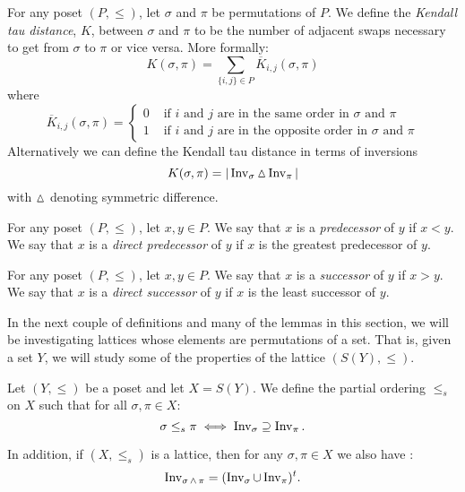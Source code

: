 	\begin{definition}
		\label{kendall-tau-definition}
		For any poset $(P, \le)$, let $\sigma$ and $\pi$ be permutations of $P$. We define the \emph{Kendall tau distance}, $K$, between $\sigma$ and $\pi$ to be the number of adjacent swaps necessary to get from $\sigma$ to $\pi$ or vice versa. More formally:
		\[
			K(\sigma, \pi) = \sum_{\{i, j\} \in P} \overline{K}_{i, j}(\sigma, \pi)
		\]
		where
		\[
			\overline{K}_{i,j}(\sigma, \pi) =
				\begin{cases}
					0 & \textrm{ if } i \textrm{ and } j \textrm{ are in the same order in } \sigma \textrm{ and } \pi \\
					1 & \textrm{ if } i \textrm{ and } j \textrm{ are in the opposite order in } \sigma \textrm{ and } \pi
				\end{cases}
		\]
		Alternatively we can define the Kendall tau distance in terms of inversions
		\[
			K(\sigma, \pi) = |\operatorname{Inv}_{\sigma} \operatorname{\vartriangle} \operatorname{Inv}_{\pi}|
		\]
		with $\operatorname{\vartriangle}$ denoting symmetric difference.
	\end{definition}

	\begin{definition}
		For any poset $(P, \le)$, let $x,y \in P$. We say that $x$ is a \emph{predecessor} of $y$ if $x < y$. We say that $x$ is a \emph{direct predecessor} of $y$ if $x$ is the greatest predecessor of $y$.
	\end{definition}

	\begin{definition}
		For any poset $(P, \le)$, let $x,y \in P$. We say that $x$ is a \emph{successor} of $y$ if $x > y$. We say that $x$ is a \emph{direct successor} of $y$ if $x$ is the least successor of $y$.
	\end{definition}

	In the next couple of definitions and many of the lemmas in this section, we will be investigating lattices whose elements are permutations of a set. That is, given a set $Y$, we will study some of the properties of the lattice $(S(Y), \le)$.

	\begin{definition}[$\le_s$]
		\label{partial-order-s-definition}
		Let $(Y, \le)$ be a poset and let $X = S(Y)$. We define the partial ordering $\le_s$ on $X$ such that for all $\sigma, \pi \in X$:
		\[
			\sigma \le_s \pi \iff \operatorname{Inv}_{\sigma} \supseteq \operatorname{Inv}_{\pi}.
		\]

		In addition, if $(X, \le_s)$ is a lattice, then for any $\sigma, \pi \in X$ we also have \cite{markowsky1994permutation}:
		\[
			\operatorname{Inv}_{\sigma \operatorname{\wedge} \pi} = (\operatorname{Inv}_{\sigma} \cup \operatorname{Inv}_{\pi})^t.
		\]
	\end{definition}

